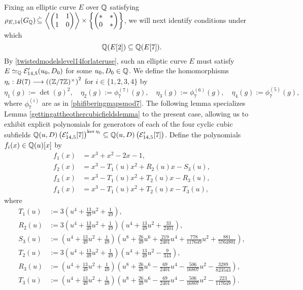 Fixing an elliptic curve $E$ over $\mathbb{Q}$ satisfying $\rho_{E,14}(G_{\mathbb{Q}}) \, \dot\subseteq \, \left\langle \begin{pmatrix} 1 & 1 \\ 1 & 0 \end{pmatrix} \right\rangle \times \left\{ \begin{pmatrix} * & * \\ 0 & * \end{pmatrix} \right\}$, we will next identify conditions under which
\[
\mathbb{Q}(E[2]) \subseteq \mathbb{Q}(E[7]).
\]
By \eqref{twistedmodelslevel14forlateruse}, such an elliptic curve $E$ must satisfy $E \simeq_{\mathbb{Q}} \mathcal{E}_{14,5}'(u_0,D_0)$ for some $u_0, D_0 \in \mathbb{Q}$.
We define the homomorphisms $\eta_i : B(7) \longrightarrow \left( (\mathbb{Z}/7\mathbb{Z})^\times \right)^2$ for $i \in \{ 1, 2, 3, 4 \}$ by
\begin{equation} \label{defofetasubis}
\eta_1(g) := \det(g)^2, \quad \eta_2(g) := \phi_7^{(7)}(g), \quad \eta_3(g) := \phi_7^{(6)}(g), \quad \eta_4(g) := \phi_7^{(5)}(g),
\end{equation}
where $\phi_7^{(i)}$ are as in \eqref{phifiberingmapsmod7}.
The following lemma specializes Lemma \ref{gettingattheothercubicfieldslemma} to the present case, allowing us to exhibit explicit polynomials for generators of each of the four cyclic cubic subfields $\mathbb{Q}(u,D)\left(\mathcal{E}_{14,5}'[7] \right)^{\ker \eta_i} \subseteq \mathbb{Q}(u,D)\left( \mathcal{E}_{14,5}'[7] \right)$. 
Define the polynomials $f_i(x) \in \mathbb{Q}(u)[x]$ by
\begin{equation} \label{defoffgandh}
\begin{split}
f_1(x) &= x^3 +x^2 - 2x - 1, \\
f_2(x) &= x^3 - T_1(u) x^2 + R_2(u) x - S_3(u), \\
f_3(x) &= x^3 - T_1(u) x^2 + T_2(u) x - R_3(u), \\
f_4(x) &= x^3 - T_1(u) x^2 + T_2(u) x - T_3(u),
\end{split}
\end{equation}
where
\begin{equation} \label{cycliccubiccoefficients}
\begin{split}
T_1(u) &:= 3\left( u^4 + \frac{13}{49}u^2 + \frac{1}{49} \right), \\
R_2(u) &:= 3\left( u^4 + \frac{13}{49}u^2 + \frac{1}{49} \right) \left( u^4 + \frac{13}{49}u^2 + \frac{33}{2401} \right), \\
S_3(u) &:= \left( u^4 + \frac{13}{49}u^2 + \frac{1}{49} \right) \left( u^8 + \frac{26}{49}u^6 + \frac{219}{2401}u^4 + \frac{778}{117649}u^2 + \frac{881}{5764801} \right), \\
T_2(u) &:= 3\left( u^4 + \frac{13}{49}u^2 + \frac{1}{49} \right) \left( u^4 + \frac{13}{49}u^2 - \frac{9}{343} \right), \\
R_3(u) &:= \left( u^4 + \frac{13}{49}u^2 + \frac{1}{49} \right) \left( u^8 + \frac{26}{49}u^6 - \frac{69}{2401}u^4 - \frac{506}{16807}u^2 - \frac{3289}{823543} \right), \\
T_3(u) &:= \left( u^4 + \frac{13}{49}u^2 + \frac{1}{49} \right) \left( u^8 + \frac{26}{49}u^6 - \frac{69}{2401}u^4 - \frac{506}{16807}u^2 - \frac{223}{117649} \right).
\end{split}
\end{equation}
